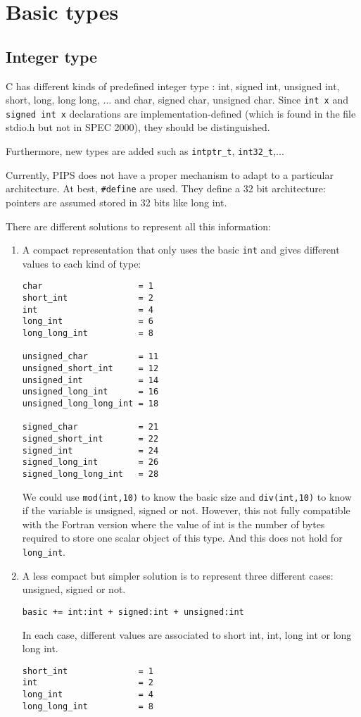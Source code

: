 \documentclass[a4paper]{report}
\begin{document}
\section{Basic types}

\subsection{Integer type}
\label{int}

C has different kinds of predefined integer type : int, signed int,
 unsigned int, short, long, long long, ... and char, signed char,
 unsigned char. Since \verb/int x/ and \verb/signed int x/
 declarations are implementation-defined (which is found in the file
 stdio.h but not in SPEC 2000), they should be distinguished.

Furthermore, new types are added such as \verb/intptr_t/,
 \verb/int32_t/,...

Currently, PIPS does not have a proper mechanism to adapt to a
 particular architecture. At best, \verb/#define/ are used. They
 define a 32 bit architecture: pointers are assumed stored in 32 bits
 like long int.

There are different solutions to represent all this information:
\begin{enumerate}
\item A compact representation that only uses the basic \verb/int/ and gives different values to
each kind of type:
\begin{verbatim}
char                   = 1
short_int              = 2
int                    = 4
long_int               = 6
long_long_int          = 8

unsigned_char          = 11
unsigned_short_int     = 12
unsigned_int           = 14
unsigned_long_int      = 16
unsigned_long_long_int = 18

signed_char            = 21
signed_short_int       = 22
signed_int             = 24
signed_long_int        = 26
signed_long_long_int   = 28
\end{verbatim}

We could use \verb/mod(int,10)/ to know the basic size and
 \verb/div(int,10)/ to know if the variable is unsigned, signed or
 not. However, this not fully compatible with the Fortran version
 \cite{Coel01} where the value of int is the number of bytes required
 to store one scalar object of this type. And this does not hold for \verb/long_int/.

\item A less compact but simpler solution is to represent three different
  cases: unsigned, signed or not. 

\verb/basic += int:int + signed:int + unsigned:int/

In each case, different values are associated to short int,
int, long int or long long int. 
\begin{verbatim}
short_int              = 1
int                    = 2
long_int               = 4
long_long_int          = 8
\end{verbatim}
\end{enumerate}
\end{document}
